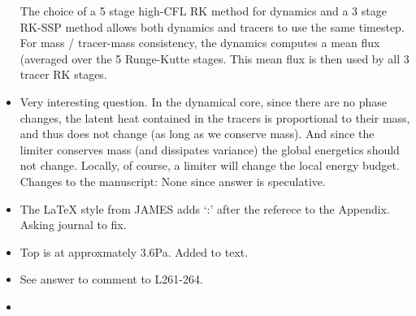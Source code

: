 \documentclass[11pt]{article}
\begin{document}
\begin{itemize}
The choice of a 5 stage high-CFL RK method for dynamics and a 3 stage RK-SSP method
allows both dynamics and tracers to use the same timestep.  
For mass / tracer-mass consistency, the dynamics computes a mean flux (averaged over
the 5 Runge-Kutte stages.  This mean flux is then used by all 3 tracer RK stages.

\item {\color{blue}{L545-550: Tracer concentrations need to be positive definite as outlined, which may require some sort of limiters. When water tracers are involved, such mechanisms, however, not only affect the tracer budgets, but generally also the energetics. Does CAM-SE relate tracer tendency limitations to the energetics? Or does ``setting to zero'' of a mixing ratio necessarily cause an energetic inconsistency? It would be valuable to have some explanation on this aspect.}}

Very interesting question. In the dynamical core, since there are no phase changes, the latent heat contained in the tracers is proportional to their mass, and thus does not change (as long as we conserve mass).  And since the limiter conserves mass (and dissipates variance) the global energetics should not change. Locally, of course, a limiter will change the local energy budget.\\

Changes to the manuscript: None since answer is speculative.

\item {\color{blue}{L586: ... Appendix D. When ...}}

The LaTeX style from JAMES adds `:' after the referece to the Appendix. Asking journal to fix.

\item {\color{blue}{L701: Please specify the model top of the 32 level version used here.}}

Top is at approxmately 3.6Pa. Added to text.

\item {}

See answer to comment to L261-264.

\item {\color{blue}{L803-806: If the explanations outlined in Fig.8 holds, the same effects should unfold in realistic experiments, though they might be less visible.}}


\end{itemize}
\end{document}
